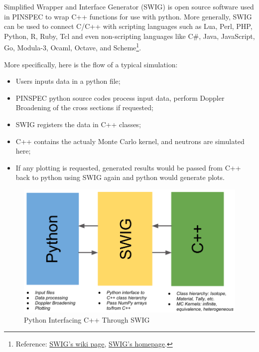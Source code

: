 \documentclass[titlepage]{article}
\begin{document}
Simplified Wrapper and Interface Generator (SWIG) is open source software used in PINSPEC to wrap C++ functions for use with python. More generally, SWIG can be used to connect C/C++ with scripting languages such as Lua, Perl, PHP, Python, R, Ruby, Tcl and even non-scripting languages like C\#, Java, JavaScript, Go, Modula-3, Ocaml, Octave, and Scheme\footnote{Reference: \href{http://en.wikipedia.org/wiki/SWIG}{SWIG's wiki page}, \href{http://www.swig.org/exec.html}{SWIG's homepage}.}. 

More specifically, here is the flow of a typical simulation:
\begin{itemize}
\item Users inputs data in a python file;
\item PINSPEC python source codes process input data, perform Doppler Broadening of the cross sections if requested;
\item SWIG registers the data in C++ classes;
\item C++ contains the actualy Monte Carlo kernel, and neutrons are simulated here;
\item If any plotting is requested, generated results would be passed from C++ back to python using SWIG again and python would generate plots. 
\end{itemize}
\begin{figure}[h]
  \centering
  \includegraphics[width=5in]{images/high-level.png}
  \caption{Python Interfacing C++ Through SWIG} \label{high-level}
\end{figure}


\clearpage
\end{document}

